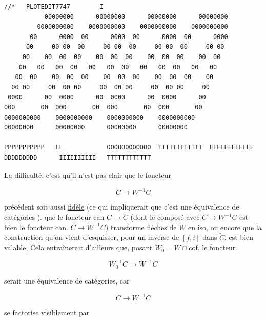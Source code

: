{\fontsize{4}{5}\selectfont
\begin{verbatim}
//*   PLOTEDIT7747        I
           00000000      00000000      00000000      00000000
         0000000000    0000000000    0000000000    0000000000
       00      0000  00      0000  00      0000  00      0000
      00     00 00  00     00 00  00     00 00  00     00 00
     00    00  00  00    00  00  00    00  00  00    00  00
    00   00   00  00   00   00  00   00   00  00   00   00
   00  00    00  00  00    00  00  00    00  00  00    00
  00 00     00  00 00     00  00 00     00  00 00     00
 0000      00  0000      00  0000      00  0000      00
000       00  000       00  000       00  000       00
0000000000    0000000000    0000000000    0000000000
00000000      00000000      00000000      00000000

PPPPPPPPPPP   LL            OOOOOOOOOOOO  TTTTTTTTTTTT  EEEEEEEEEEEE  DDDDDDDDD      IIIIIIIIII   TTTTTTTTTTTT
\end{verbatim}
}


La difficulté, c'est qu'il n'est pas clair que le foncteur

\[
 \widetilde C\longrightarrow W^{-1}C
\]

précédent soit aussi \uline{fidèle} (ce qui impliquerait que c'est une équivalence de catégories ).   que le foncteur can $C\longrightarrow\widetilde C$ (dont le composé avec $\widetilde C\longrightarrow W^{-1}C$ est bien le foncteur can. $C\longrightarrow W^{-1}C$) transforme flèches de $W$ en iso, ou encore que la construction qu'on vient  d'esquisser, pour   un inverse de $[f,i]$ dans $\widetilde C$, est bien valable,  Cela entraînerait d'ailleurs  que,  posant $W_0=W\cap\mathrm{cof}$, le foncteur

\[
 W_0^{-1}C\longrightarrow W^{-1}C
\]

serait une équivalence de catégories, car

\[
 \widetilde C\longrightarrow W^{-1}C
\]

se factorise visiblement par


